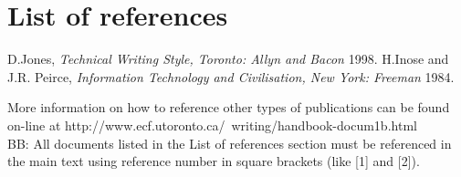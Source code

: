 \chapter{List of references}
\noindent 
\begin{thebibliography}{1}
 D.Jones, {\em Technical Writing Style, Toronto: Allyn and Bacon}  1998.
 H.Inose and J.R. Peirce, {\em Information Technology and Civilisation, New York: Freeman}  1984.
\end{thebibliography}
More information on how to reference other types of publications can be found on-line at http://www.ecf.utoronto.ca/~writing/handbook-docum1b.html\\
BB: All documents listed in the List of references section must be referenced in the main text using reference number in square brackets (like [1] and [2]).
